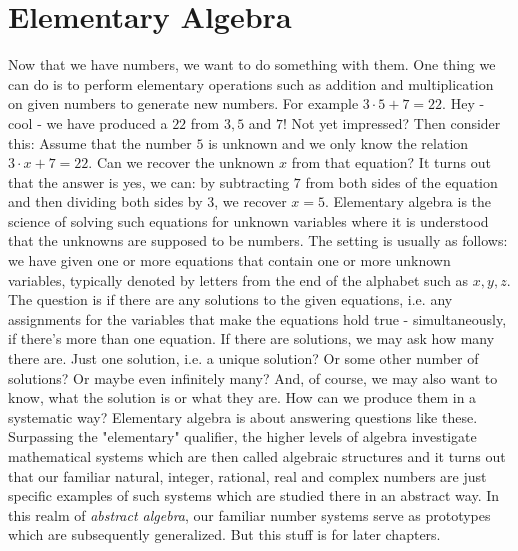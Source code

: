 \section{Elementary Algebra}
Now that we have numbers, we want to do something with them. One thing we can do is to perform elementary operations such as addition and multiplication on given numbers to generate new numbers. For example $3 \cdot 5 + 7 = 22$. Hey - cool - we have produced a $22$ from $3,5$ and $7$! Not yet impressed? Then consider this: Assume that the number $5$ is unknown and we only know the relation $3 \cdot x + 7 = 22$. Can we recover the unknown $x$ from that equation? It turns out that the answer is yes, we can: by subtracting $7$ from both sides of the equation and then dividing both sides by $3$, we recover $x = 5$. Elementary algebra is the science of solving such equations for unknown variables where it is understood that the unknowns are supposed to be numbers. The setting is usually as follows: we have given one or more equations that contain one or more unknown variables, typically denoted by letters from the end of the alphabet such as $x,y,z$. The question is if there are any solutions to the given equations, i.e. any assignments for the variables that make the equations hold true - simultaneously, if there's more than one equation. If there are solutions, we may ask how many there are. Just one solution, i.e. a unique solution? Or some other number of solutions? Or maybe even infinitely many? And, of course, we may also want to know, what the solution is or what they are. How can we produce them in a systematic way? Elementary algebra is about answering questions like these. Surpassing the "elementary" qualifier, the higher levels of algebra investigate mathematical systems which are then called algebraic structures and it turns out that our familiar natural, integer, rational, real and complex numbers are just specific examples of such systems which are studied there in an abstract way. In this realm of \emph{abstract algebra}, our familiar number systems serve as prototypes which are subsequently generalized. But this stuff is for later chapters. 





